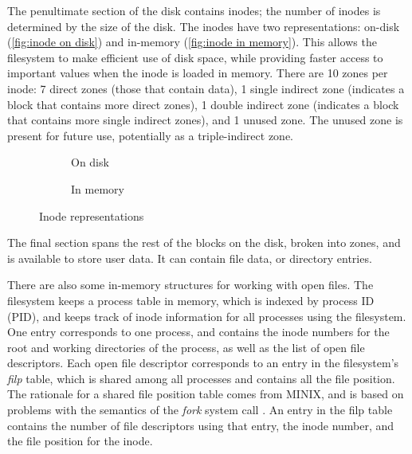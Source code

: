 The penultimate section of the disk contains inodes; the number of inodes is determined by the size of the disk.
The inodes have two representations: on-disk (\autoref{fig:inode on disk}) and in-memory (\autoref{fig:inode in memory}).
This allows the filesystem to make efficient use of disk space, while providing faster access to important values when the inode is loaded in memory.
There are 10 zones per inode: 7 direct zones (those that contain data), 1 single indirect zone (indicates a block that contains more direct zones), 1 double indirect zone (indicates a block that contains more single indirect zones), and 1 unused zone.
The unused zone is present for future use, potentially as a triple-indirect zone.

\begin{figure}
  \centering
  \begin{subfigure}[b]{0.49\textwidth}
    \centering
    \caption{On disk}
    \label{fig:inode on disk}
  \end{subfigure}
  \hfill
  \begin{subfigure}[b]{0.49\textwidth}
    \centering
    \caption{In memory}
    \label{fig:inode in memory}
  \end{subfigure}
  \hfill
  \caption{Inode representations}
  \label{fig:inode representations}
\end{figure}

The final section spans the rest of the blocks on the disk, broken into zones, and is available to store user data.
It can contain file data, or directory entries.

There are also some in-memory structures for working with open files.
The filesystem keeps a process table in memory, which is indexed by process ID (PID), and keeps track of inode information for all processes using the filesystem.
One entry corresponds to one process, and contains the inode numbers for the root and working directories of the process, as well as the list of open file descriptors.
Each open file descriptor corresponds to an entry in the filesystem's \textit{filp} table, which is shared among all processes and contains all the file position.
The rationale for a shared file position table comes from MINIX, and is based on problems with the semantics of the \textit{fork} system call \cite{tanenbaum1997}.
An entry in the filp table contains the number of file descriptors using that entry, the inode number, and the file position for the inode.

